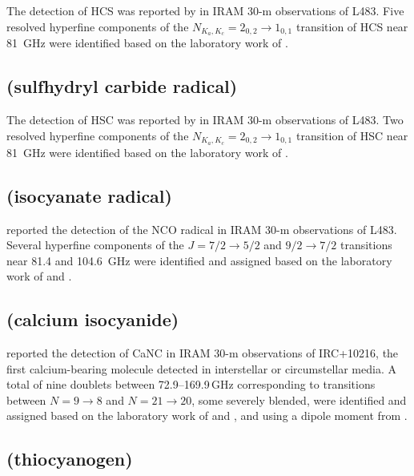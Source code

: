 \documentclass[twocolumn]{aastex631}
\newcommand{\update}[1]{{#1}}
\begin{document}
	The detection of HCS was reported by \citet{Agundez:2018kh} in IRAM 30-m observations of L483.  Five resolved hyperfine components of the $N_{K_a,K_c} = 2_{0,2}\rightarrow1_{0,1}$ transition of HCS near 81~GHz were identified based on the laboratory work of \citet{Habara:2002gd}.
	
	\subsection{ (sulfhydryl carbide radical)}
	\label{HSC}
	
	The detection of HSC was reported by \citet{Agundez:2018kh} in IRAM 30-m observations of L483.  Two resolved hyperfine components of the $N_{K_a,K_c} = 2_{0,2}\rightarrow1_{0,1}$ transition of HSC near 81~GHz were identified based on the laboratory work of \citet{Habara:2000dy}.
	
	\subsection{ (isocyanate radical)}
	\label{NCO}
	
	\citet{Marcelino:2018cp} reported the detection of the NCO radical in IRAM 30-m observations of L483.  Several hyperfine components of the $J = 7/2\rightarrow5/2$ and $9/2\rightarrow7/2$ transitions near 81.4 and 104.6~GHz were identified and assigned based on the laboratory work of \citet{Saito:1970if} and \citet{Kawaguchi:1985hf}.
	
	\subsection{\update{ (calcium isocyanide)}}
	\label{CaNC}
	
	\update{\citet{Cernicharo:2019ik} reported the detection of CaNC in IRAM 30-m observations of IRC+10216, the first calcium-bearing molecule detected in interstellar or circumstellar media.   A total of nine doublets between 72.9--169.9\,GHz corresponding to transitions between $N=9\rightarrow8$ and $N=21\rightarrow20$, some severely blended, were identified and assigned based on the laboratory work of \citet{Steimle:1993ud} and \citet{Scurlock:1994cd}, and using a dipole moment from \citet{Steimle:1992bk}.}
	
	\subsection{\update{ (thiocyanogen)}}
	\label{NCS}
	
\end{document}
